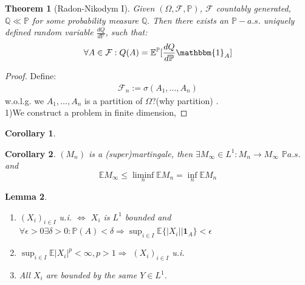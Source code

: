 \documentclass[a4paper,11pt]{book}
\newtheorem{theorem}{Theorem}[section]
\newtheorem{corollary}{Corollary}[theorem]
\newtheorem{lemma}[theorem]{Lemma}
\theoremstyle{definition}
\theoremstyle{remark}
\begin{document}
\begin{theorem}[Radon-Nikodym I]
	Given $(\Omega, \mathcal{F}, \mathbb{P})$, $\mathcal{F}$ countably generated, $\mathbb{Q} \ll \mathbb{P}$ for some probability measure $\mathbb{Q}.$ Then there exists an $\mathbb{P}-a.s.$ uniquely defined random variable $\frac{dQ}{d\mathbb{P}}$, such that:
	\begin{align*}
		\forall A \in \mathcal{F}: Q(A) = \mathbb{E}^\mathbb{P}[\frac{dQ}{d\mathbb{P}} \mathbbm{1}_{A}]
	\end{align*}
\end{theorem}
\begin{proof}
	Define:
	\begin{align*}
		\mathcal{F}_n:= \sigma(A_1, \dots, A_n)
	\end{align*}
	w.o.l.g. we $A_1, \dots, A_n$ is a partition of $\Omega$?(why partition) \label{Q}.\\
	1)We construct a problem in finite dimension, 
\end{proof}

\begin{corollary}
	
\end{corollary}











 
\begin{corollary}
 	$(M_n)$ is a (super)martingale, then $\exists M_\infty \in L^1: M_n \rightarrow M_\infty$ $\mathbb{P} a.s.$ and 
 	\begin{equation*}
 		\mathbb{E}M_\infty \leq \liminf_n \mathbb{E} M_n = \inf_n \mathbb{E} M_n
 	\end{equation*}
 \end{corollary}
 

 
 \begin{lemma} \quad
 	\begin{enumerate}
 		\item $(X_i)_{i \in I}$ u.i. $\Leftrightarrow$ $X_i$ is $L^1$ bounded and $\forall \epsilon > 0 \exists \delta > 0: \mathbb{P}(A) < \delta \Rightarrow \sup_{i \in I}\mathbb{E}\{|X_i|| \textbf{1}_A\} < \epsilon$
 		\item $\sup_{i \in I}\mathbb{E} |X_i|^p < \infty, p > 1 \Rightarrow$ $(X_i)_{i \in I}$ u.i.  
 		\item All $X_i$ are bounded by the same $Y \in L^1$.
 	\end{enumerate}
 \end{lemma}
 
\end{document}
